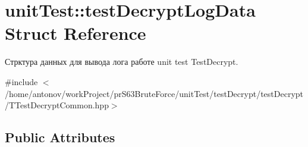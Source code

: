 \hypertarget{structunit_test_1_1test_decrypt_log_data}{}\section{unit\+Test\+:\+:test\+Decrypt\+Log\+Data Struct Reference}
\label{structunit_test_1_1test_decrypt_log_data}


Стрктура данных для вывода лога работе unit test Test\+Decrypt.  




{\ttfamily \#include $<$/home/antonov/work\+Project/pr\+S63\+Brute\+Force/unit\+Test/test\+Decrypt/test\+Decrypt/\+T\+Test\+Decrypt\+Common.\+hpp$>$}

\subsection*{Public Attributes}
